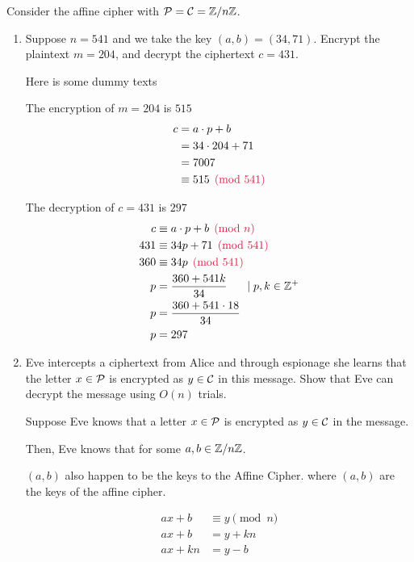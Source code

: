 \begin{problem}
Consider the affine cipher with $\mathcal{P}=\mathcal{C}=\mathbb{Z}/n\mathbb{Z}$.  
\begin{enumerate}\renewcommand{\itemsep}{3mm}
\item Suppose $n=541$ and we take the key $(a,b)=(34,71)$.  Encrypt the plaintext $m=204$, and decrypt the ciphertext $c=431$.
\begin{Answer}

  Here is some dummy texts

\noindent
The encryption of $m=204$ is $515$
\begin{align*}
  c &= a \cdot p + b\\
  &= 34 \cdot 204 + 71\\
  &= 7007\\
  &\equiv 515 \crim{\pmod{541}}
\end{align*}

\noindent
The decryption of $c=431$ is $297$
\begin{align*}
  c &\equiv a \cdot p + b \crim{\pmod n}\\
  431 &\equiv 34p + 71 \crim{\pmod{541}}\\
  360 &\equiv 34p \crim{\pmod{541}}\\
  p &= \frac{360 + 541k}{34}  \hspace{15pt}\mid p,k \in \Z^+\\
  p &= \frac{360 + 541\cdot 18}{34}\\
  p &= 297
\end{align*}

\end{Answer}

\item Eve intercepts a ciphertext from Alice
and through espionage she learns that the letter
$x \in \mathcal{P}$ is encrypted as $y \in \mathcal{C}$ in this message.
Show that Eve can decrypt the message using $O(n)$ trials.  
\begin{Answer}

Suppose Eve knows that a letter $x \in \mathcal{P}$ is encrypted as
$y \in \mathcal{C}$ in the message.

\noindent
Then, Eve knows that  for some $a, b \in \mathbb{Z}/n\mathbb{Z}$.

\noindent $(a, b)$ also happen to be the keys to the Affine Cipher.
where $(a, b)$ are the keys of the affine cipher.

\begin{align*}
  ax + b &\equiv y \pmod n\\
  ax + b &= y + kn\\
  ax + kn &= y - b\\
\end{align*}


\end{Answer}
\end{enumerate}
\end{problem}
